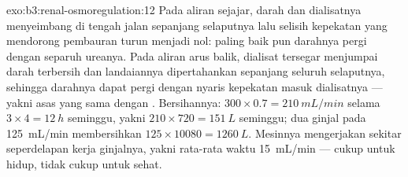 \begin{solution}{exo:b3:renal-osmoregulation:12}
Pada aliran sejajar, darah dan dialisatnya menyeimbang di tengah jalan sepanjang
selaputnya lalu selisih kepekatan yang mendorong pembauran turun
menjadi nol: paling baik pun darahnya pergi dengan separuh ureanya. Pada aliran arus
balik, dialisat tersegar menjumpai darah terbersih dan
landaiannya dipertahankan sepanjang seluruh selaputnya, sehingga darahnya dapat
pergi dengan nyaris kepekatan masuk dialisatnya --- yakni asas
yang sama dengan . Bersihannya: $300\times 0.7 =
\qty{210}{mL/min}$ selama $3\times 4 = \qty{12}{h}$ seminggu, yakni
$210\times 720 = \qty{151}{L}$ seminggu; dua ginjal pada
\qty{125}{mL/min} membersihkan $125\times\num{10080} = \qty{1260}{L}$.
Mesinnya mengerjakan sekitar seperdelapan kerja ginjalnya, yakni rata-rata waktu
\qty{15}{mL/min} --- cukup untuk hidup, tidak cukup untuk sehat.
\end{solution}

